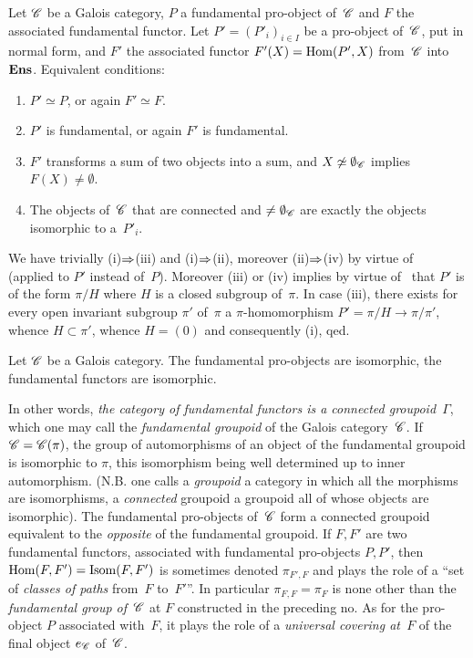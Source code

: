 \begin{proposition}
\label{V.5.6}
Let $\cal{C}$ be a Galois category, $P$ a fundamental
pro-object of~$\cal{C}$ and $F$ the associated fundamental
functor. Let $P'=(P'_i)_{i\in I}$ be a pro-object of~$\cal{C}$, put
in normal form, and $F'$ the associated functor $F'(X)=\operatorname{Hom}(P',X)$
from~$\cal{C}$ into~$\mathbf{Ens}$. Equivalent conditions:
\begin{enumerate}
\item[(i)] $P'\simeq P$, or again $F'\simeq F$.
\item[(ii)] $P'$ is fundamental, or again $F'$ is
fundamental.
\item[(iii)] $F'$ transforms a sum of two objects into a sum, and
$X\not\simeq\emptyset_{\cal{C}}$ implies $F(X)\ne\emptyset$.
\item[(iv)]
The objects of~$\cal{C}$ that are connected and $\ne\emptyset_{\cal{C}}$ are
exactly the objects isomorphic to a~$P'_i$.
\end{enumerate}
\end{proposition}

We have trivially (i)$\To$(iii) and (i)$\To$(ii),
moreover (ii)$\To$(iv) by virtue of~ (applied
to $P'$ instead of~$P$). Moreover (iii) or (iv) implies by virtue
of~ that $P'$ is of the form $\pi/H$ where $H$ is a
closed subgroup of~$\pi$. In case (iii), there exists for every
open invariant subgroup $\pi'$ of~$\pi$ a $\pi$-homomorphism
$P'=\pi/H\to \pi/\pi'$, whence $H\subset \pi'$, whence $H=(0)$ and
consequently (i), qed.

\begin{corollary}
\label{V.5.7}
Let $\cal{C}$ be a Galois category. The fundamental
pro-objects are isomorphic, the fundamental functors are
isomorphic.
\end{corollary}

In other words, \emph{the category of fundamental functors
is a connected groupoid~$\Gamma$},
which one may call the \emph{fundamental groupoid}
of the Galois category~$\cal{C}$. If $\cal{C}=\cal{C}(\pi)$,
the group of automorphisms of an object of the fundamental groupoid
is isomorphic to $\pi$, this isomorphism being well
determined up to inner automorphism. (N.B. one
calls a \emph{groupoid} a category in which all the
morphisms are isomorphisms, a \emph{connected} groupoid a
groupoid all of whose objects are isomorphic). The fundamental
pro-objects of~$\cal{C}$ form a connected groupoid
equivalent to the \emph{opposite} of the fundamental
groupoid. If $F, F'$ are two fundamental functors, associated
with fundamental pro-objects $P, P'$, then $\operatorname{Hom}(F, F')=\operatorname{Isom}(F,
F')$ is sometimes denoted $\pi_{F', F}$ and plays the role of a
``set of \emph{classes of paths} from~$F$ to~$F'$''. In
particular $\pi_{F, F}=\pi_F$ is none other than the \emph{fundamental
group of~$\cal{C}$} at $F$ constructed in the preceding
no. As for the pro-object $P$ associated with~$F$, it
plays the role of a \emph{universal covering at~$F$} of
the final object $e_{\cal{C}}$ of~$\cal{C}$.

